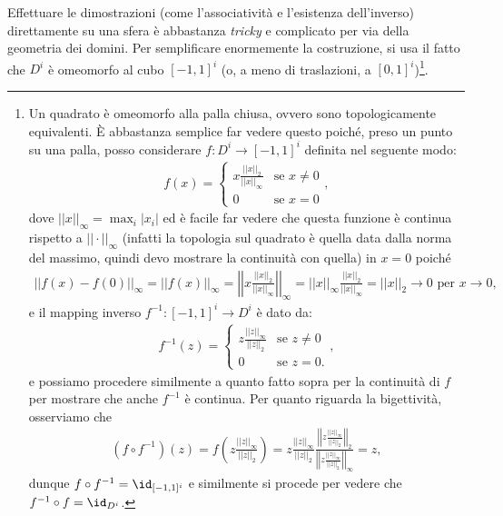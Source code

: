 Effettuare le dimostrazioni (come l'associatività e l'esistenza dell'inverso) direttamente su una sfera è abbastanza \emph{tricky} e complicato per via della geometria dei domini. Per semplificare enormemente la costruzione, si usa il fatto che $D^i$ è omeomorfo al cubo $[-1, 1]^i$ (o, a meno di traslazioni, a $[0,1]^i$)\footnote{Un quadrato è omeomorfo alla palla chiusa, ovvero sono topologicamente equivalenti. È abbastanza semplice far vedere questo poiché,
preso un punto su una palla, posso considerare $f: D^i \to [-1,1]^i$ definita nel seguente modo:
\begin{align}
    f(x) = \begin{cases}
        x\frac{||x||_2}{||x||_{\infty}} & \text{se } x \neq 0 \\
        0 & \text{se } x = 0
    \end{cases},
\end{align}
dove $||x||_\infty = \max_i{|x_i|}$ ed è facile far vedere che questa funzione è continua rispetto a $||\cdot||_{\infty}$ (infatti la topologia sul quadrato è quella data dalla norma del massimo, quindi devo mostrare la continuità con quella) in $x=0$ poiché
\begin{align}
    ||f(x) - f(0)||_{\infty} = ||f(x)||_{\infty} = \left|\left|x\frac{||x||_2}{||x||_{\infty}}\right|\right|_{\infty} = ||x||_{\infty} \frac{||x||_2}{||x||_\infty} = ||x||_2 \to 0 \text{ per } x \to 0,
\end{align}
e il mapping inverso $f^{-1}: [-1, 1]^i \to D^i$ è dato da:
\begin{align}
    f^{-1}(z) = \begin{cases}
        z \frac{||z||_{\infty}}{||z||_2} & \text{se } z \neq 0 \\
        0 & \text{se } z = 0.
    \end{cases},
\end{align}
e possiamo procedere similmente a quanto fatto sopra per la continuità di $f$ per mostrare che anche $f^{-1}$ è continua. Per quanto riguarda la bigettività, osserviamo che
\begin{align}
    (f \circ f^{-1})(z) = f\left(z \frac{||z||_{\infty}}{||z||_2}\right) = z \frac{||z||_{\infty}}{||z||_2} \frac{\left|\left|z \frac{||z||_{\infty}}{||z||_{2}}\right|\right|_{2}}{\left|\left| z \frac{||z||_{\infty}}{||z||_{2}} \right|\right|_\infty} = z,
\end{align}
dunque $f \circ f^{-1} = \id_{[-1, 1]^i}$ e similmente si procede per vedere che $f^{-1} \circ f = \id_{D^i}$.
}.
 

